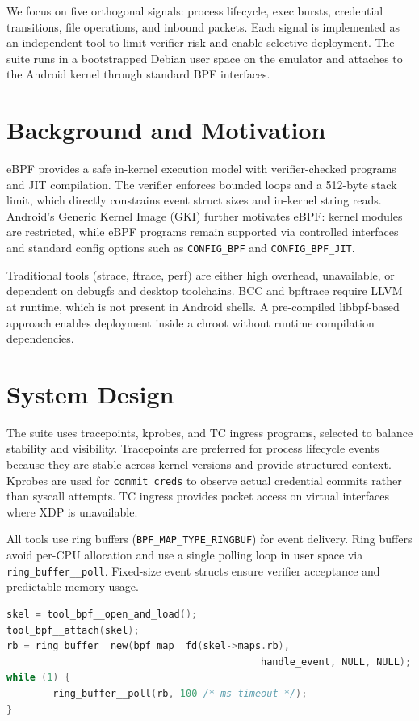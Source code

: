 \documentclass[conference]{IEEEtran}
\begin{document}
We focus on five orthogonal signals: process lifecycle, exec bursts, credential transitions, file operations, and inbound packets. Each signal is implemented as an independent tool to limit verifier risk and enable selective deployment. The suite runs in a bootstrapped Debian user space on the emulator and attaches to the Android kernel through standard BPF interfaces.

\section{Background and Motivation}
eBPF provides a safe in-kernel execution model with verifier-checked programs and JIT compilation. The verifier enforces bounded loops and a 512-byte stack limit, which directly constrains event struct sizes and in-kernel string reads. Android's Generic Kernel Image (GKI) further motivates eBPF: kernel modules are restricted, while eBPF programs remain supported via controlled interfaces and standard config options such as \texttt{CONFIG\_BPF} and \texttt{CONFIG\_BPF\_JIT}.\cite{ebpf_linux_doc,android_gki}

Traditional tools (strace, ftrace, perf) are either high overhead, unavailable, or dependent on debugfs and desktop toolchains. BCC and bpftrace require LLVM at runtime, which is not present in Android shells. A pre-compiled libbpf-based approach enables deployment inside a chroot without runtime compilation dependencies.\cite{bpftrace_doc,libbpf_doc}

\section{System Design}
The suite uses tracepoints, kprobes, and TC ingress programs, selected to balance stability and visibility. Tracepoints are preferred for process lifecycle events because they are stable across kernel versions and provide structured context. Kprobes are used for \texttt{commit\_creds} to observe actual credential commits rather than syscall attempts. TC ingress provides packet access on virtual interfaces where XDP is unavailable.

All tools use ring buffers (\texttt{BPF\_MAP\_TYPE\_RINGBUF}) for event delivery. Ring buffers avoid per-CPU allocation and use a single polling loop in user space via \texttt{ring\_buffer\_\_poll}. Fixed-size event structs ensure verifier acceptance and predictable memory usage.\cite{libbpf_doc}

\begin{lstlisting}[language=C,caption={Generic user-space loader and ring buffer loop}]
skel = tool_bpf__open_and_load();
tool_bpf__attach(skel);
rb = ring_buffer__new(bpf_map__fd(skel->maps.rb),
                                            handle_event, NULL, NULL);
while (1) {
        ring_buffer__poll(rb, 100 /* ms timeout */);
}
\end{lstlisting}
\end{document}
